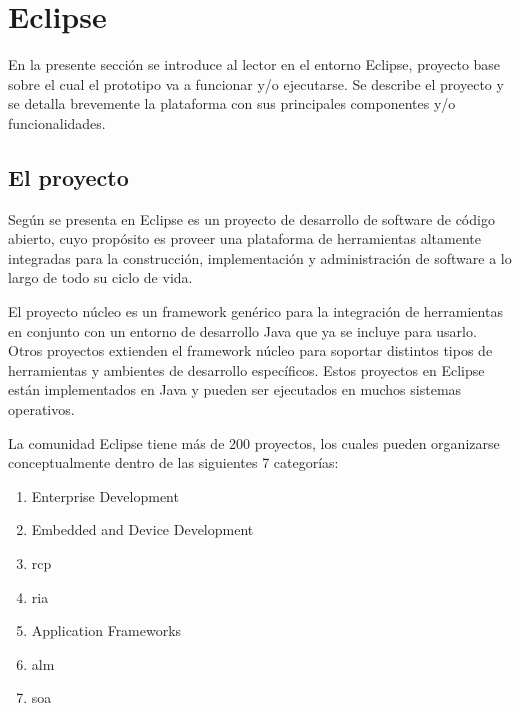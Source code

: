 \documentclass[a4paper,12pt,oneside,spanish]{book}
\begin{document}
\section{Eclipse}


En la presente sección se introduce al lector en el entorno \textsf{Eclipse}, proyecto base sobre el cual el prototipo va a funcionar y/o ejecutarse. Se describe el proyecto y se detalla brevemente la plataforma con sus principales componentes y/o funcionalidades.


\subsection{El proyecto}

Según se presenta en \cite{EMFADG, Eclipse} \textsf{Eclipse} es un proyecto de desarrollo de software de código abierto, cuyo propósito es proveer una plataforma de herramientas altamente integradas para la construcción, implementación y administración de software a lo largo de todo su ciclo de vida.

El proyecto núcleo es un framework genérico para la integración de herramientas en conjunto con un entorno de desarrollo \textsf{Java} que ya se incluye para usarlo. Otros proyectos extienden el framework núcleo para soportar distintos tipos de herramientas y ambientes de desarrollo específicos. Estos proyectos en \textsf{Eclipse} están implementados en \textsf{Java} y pueden ser ejecutados en muchos sistemas operativos.

La comunidad \textsf{Eclipse} tiene más de 200 proyectos, los cuales pueden organizarse conceptualmente dentro de las siguientes 7 categorías:

\begin{enumerate}

\item Enterprise Development

\item Embedded and Device Development

\item \gls{rcp}

\item \gls{ria}

\item Application Frameworks

\item \gls{alm}

\item \gls{soa}

\end{enumerate}
\end{document}
